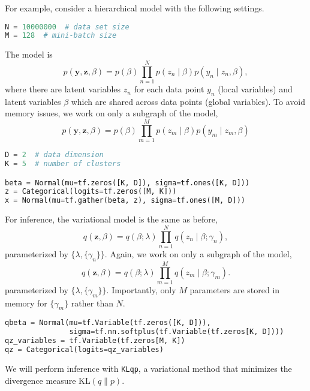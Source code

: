For example, consider a hierarchical model with the following settings.
\begin{lstlisting}[language=Python]
N = 10000000  # data set size
M = 128  # mini-batch size
\end{lstlisting}
The model is
\begin{equation*}
p(\mathbf{y}, \mathbf{z}, \beta)
= p(\beta) \prod_{n=1}^N p(z_n \mid \beta) p(y_n \mid z_n, \beta),
\end{equation*}
where there are latent variables $z_n$ for
each data point $y_n$ (local variables) and latent variables $\beta$
which are shared across data points (global variables).
To avoid memory issues, we work on only a subgraph of the model,
\begin{equation*}
p(\mathbf{y}, \mathbf{z}, \beta)
= p(\beta) \prod_{m=1}^M p(z_m \mid \beta) p(y_m \mid z_m, \beta)
\end{equation*}
\begin{lstlisting}[language=Python]
D = 2  # data dimension
K = 5  # number of clusters

beta = Normal(mu=tf.zeros([K, D]), sigma=tf.ones([K, D]))
z = Categorical(logits=tf.zeros([M, K]))
x = Normal(mu=tf.gather(beta, z), sigma=tf.ones([M, D]))
\end{lstlisting}
For inference, the variational model is the same as before,
\begin{equation*}
q(\mathbf{z}, \beta) =
q(\beta; \lambda) \prod_{n=1}^N q(z_n \mid \beta; \gamma_n),
\end{equation*}
parameterized by $\{\lambda, \{\gamma_n\}\}$.
Again, we work on only a subgraph of the model,
\begin{equation*}
q(\mathbf{z}, \beta) =
q(\beta; \lambda) \prod_{m=1}^M q(z_m \mid \beta; \gamma_m).
\end{equation*}
parameterized by $\{\lambda, \{\gamma_m\}\}$. Importantly, only $M$
parameters are stored in memory for $\{\gamma_m\}$ rather than $N$.
\begin{lstlisting}[language=Python]
qbeta = Normal(mu=tf.Variable(tf.zeros([K, D])),
               sigma=tf.nn.softplus(tf.Variable(tf.zeros[K, D])))
qz_variables = tf.Variable(tf.zeros[M, K])
qz = Categorical(logits=qz_variables)
\end{lstlisting}
We will perform inference with \texttt{KLqp}, a variational method
that minimizes the divergence measure $\text{KL}(q\| p)$.

